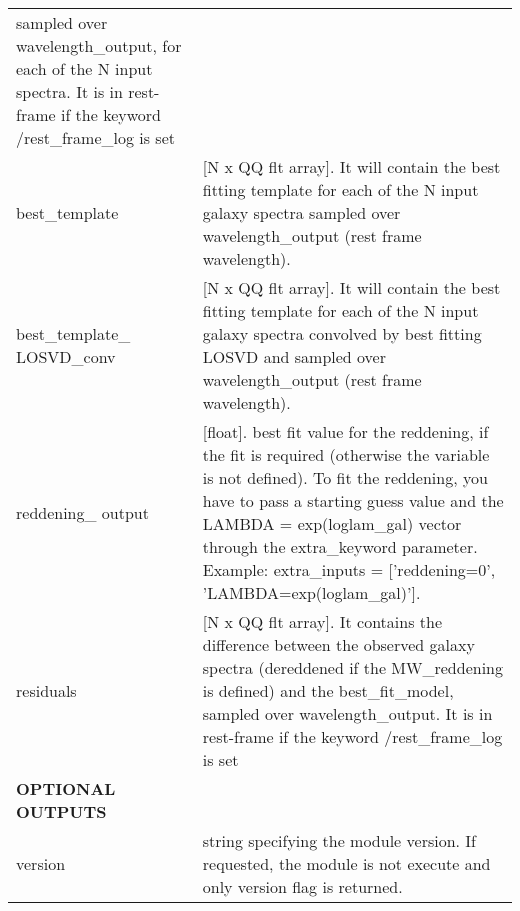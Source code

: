 \begin{center}
\begin{longtable}{p{2.7cm}| p{11.1cm}}
                      sampled over wavelength\_output, for each of the N input spectra. It is in rest-frame if the keyword /rest\_frame\_log is set\\
%
 best\_template &[N x QQ flt array]. It will contain the best fitting template for each of the N input galaxy spectra sampled over wavelength\_output (rest frame wavelength). \\
%
 best\_template\_ LOSVD\_conv &[N x QQ flt array]. It will contain the best fitting template for each of the N input galaxy spectra convolved by best fitting 
LOSVD and sampled over wavelength\_output (rest frame wavelength).\\
%
 reddening\_ output &[float]. best fit value for the reddening, if the fit is required (otherwise the variable is not defined). To fit the reddening, you have to pass a 
                        starting guess value and the LAMBDA = exp(loglam\_gal) vector through the extra\_keyword parameter. Example: extra\_inputs = ['reddening=0', 'LAMBDA=exp(loglam\_gal)'].\\
% 
 residuals &[N x QQ flt array]. It contains the difference between the observed galaxy spectra (dereddened if the MW\_reddening is defined) and the best\_fit\_model, 
                            sampled over wavelength\_output. It is in rest-frame if the keyword /rest\_frame\_log is set\\
%
\hline
{\bf  OPTIONAL OUTPUTS} &  \\
version & string specifying the module version. If requested, the module is not execute and only version flag is returned.\\
\hline
\end{longtable}
\end{center}
